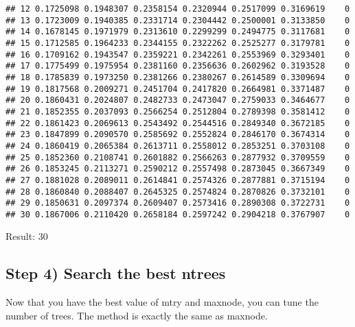 \documentclass[
]{article}
\begin{document}
\begin{verbatim}
## 12 0.1725098 0.1948307 0.2358154 0.2320944 0.2517099 0.3169619    0
## 13 0.1723009 0.1940385 0.2331714 0.2304442 0.2500001 0.3133850    0
## 14 0.1678145 0.1971979 0.2313610 0.2299299 0.2494775 0.3117681    0
## 15 0.1712585 0.1964233 0.2344155 0.2322262 0.2525277 0.3179781    0
## 16 0.1709162 0.1943547 0.2359221 0.2342261 0.2553969 0.3293401    0
## 17 0.1775499 0.1975954 0.2381160 0.2356636 0.2602962 0.3193528    0
## 18 0.1785839 0.1973250 0.2381266 0.2380267 0.2614589 0.3309694    0
## 19 0.1817568 0.2009271 0.2451704 0.2417820 0.2664981 0.3371487    0
## 20 0.1860431 0.2024807 0.2482733 0.2473047 0.2759033 0.3464677    0
## 21 0.1852355 0.2037093 0.2566254 0.2512804 0.2789398 0.3581412    0
## 22 0.1861423 0.2069613 0.2543492 0.2544516 0.2849340 0.3672185    0
## 23 0.1847899 0.2090570 0.2585692 0.2552824 0.2846170 0.3674314    0
## 24 0.1860419 0.2065384 0.2613711 0.2558012 0.2853251 0.3703108    0
## 25 0.1852360 0.2108741 0.2601882 0.2566263 0.2877932 0.3709559    0
## 26 0.1853245 0.2113271 0.2590212 0.2557498 0.2873045 0.3667349    0
## 27 0.1881028 0.2089011 0.2614841 0.2574326 0.2877881 0.3715194    0
## 28 0.1860840 0.2088407 0.2645325 0.2574824 0.2870826 0.3732101    0
## 29 0.1850631 0.2097374 0.2609407 0.2573416 0.2890308 0.3722731    0
## 30 0.1867006 0.2110420 0.2658184 0.2597242 0.2904218 0.3767907    0
\end{verbatim}

Result: 30

\hypertarget{step-4-search-the-best-ntrees}{%
\subsection{Step 4) Search the best
ntrees}\label{step-4-search-the-best-ntrees}}

Now that you have the best value of mtry and maxnode, you can tune the
number of trees. The method is exactly the same as maxnode.
\end{document}
